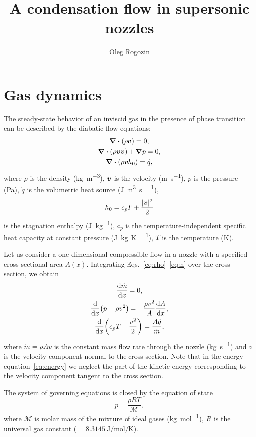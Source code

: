 \documentclass{article}
\title{A condensation flow in supersonic nozzles}
\author{Oleg Rogozin}
\newcommand{\bv}{\vb*{v}}
\begin{document}
\maketitle
\tableofcontents

\section{Gas dynamics}

The steady-state behavior of an inviscid gas in the presence of phase transition
can be described by the diabatic flow equations:
\begin{gather}
    \div(\rho\bv) = 0, \label{eq:rho}\\
    \div(\rho\bv\bv) + \grad{p} = 0, \label{eq:v}\\
    \div(\rho\bv h_0) = \dot{q}, \label{eq:h}
\end{gather}
where $\rho$ is the density (\si{\kg\per\cubic\m}), $\bv$ is the velocity (\si{\m\per\s}),
$p$ is the pressure (\si{\Pa}), $\dot{q}$ is the volumetric heat source (\si{\J\per\cubic\m\per\s}),
\begin{equation}\label{eq:h0}
    h_0 = c_pT + \frac{|\bv|^2}{2}
\end{equation}
is the stagnation enthalpy (\si{\J\per\kg}),
$c_p$ is the temperature-independent specific heat capacity at constant pressure (\si{\J\per\kg\per\K}),
$T$ is the temperature (\si{\K}).

Let us consider a one-dimensional compressible flow in a nozzle with a specified cross-sectional area $A(x)$.
Integrating Eqs.~\eqref{eq:rho}--\eqref{eq:h} over the cross section, we obtain
\begin{gather}
    \dv{\dot{m}}{x} = 0, \label{eq:continuity}\\
    \dv{x}(p + \rho v^2) = -\frac{\rho v^2}{A}\dv{A}{x}, \label{eq:momentum}\\
    \dv{x}(c_pT + \frac{v^2}{2}) = \frac{A\dot{q}}{\dot{m}}, \label{eq:energy}
\end{gather}
where $\dot{m} = \rho Av$ is the constant mass flow rate through the nozzle (\si{\kg\per\s})
and $v$ is the velocity component normal to the cross section.
Note that in the energy equation~\eqref{eq:energy} we neglect the part of the kinetic energy
corresponding to the velocity component tangent to the cross section.

The system of governing equations is closed by the equation of state
\begin{equation}\label{eq:eos}
    p = \frac{\rho RT}{\mathcal{M}},
\end{equation}
where $\mathcal{M}$ is molar mass of the mixture of ideal gases (\si{\kg\per\mol}),
$R$ is the universal gas constant ($=\SI{8.3145}{\J\per\mol\per\K}$).
\end{document}

